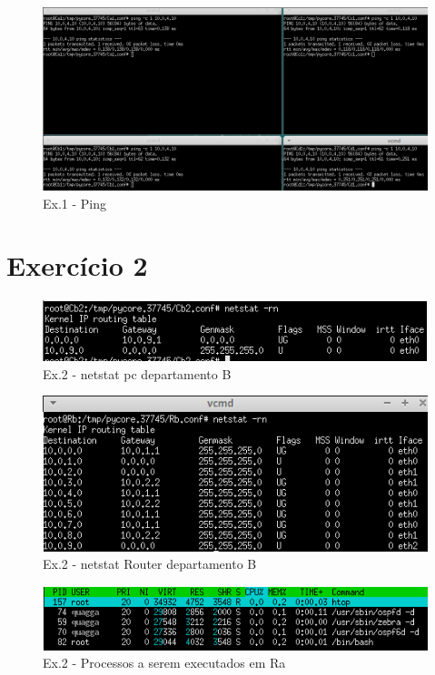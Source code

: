 \documentclass[a4paper]{report}
\begin{document}
\begin{figure}[H]
    \centering 
    \includegraphics[width=\textwidth]{images/pingEx1P2.png}
    \caption{Ex.1 - Ping}
    \label{fig:pingEx1P2}
\end{figure}

\section{Exercício 2}

\begin{figure}[H]
    \centering 
    \includegraphics[width=\textwidth]{images/netstatPcEx2P2.png}
    \caption{Ex.2 - netstat pc departamento B}
    \label{fig:netstatPcEx2P2}
\end{figure}

\begin{figure}[H]
    \centering 
    \includegraphics[width=\textwidth]{images/netstatRouterEx2P2.png}
    \caption{Ex.2 - netstat Router departamento B}
    \label{fig:netstatRouterEx2P2}
\end{figure}

\begin{figure}[H]
    \centering 
    \includegraphics[width=\textwidth]{images/htop2a.png}
    \caption{Ex.2 - Processos a serem executados em Ra}
    \label{fig:htop2a}
\end{figure}
\end{document}
